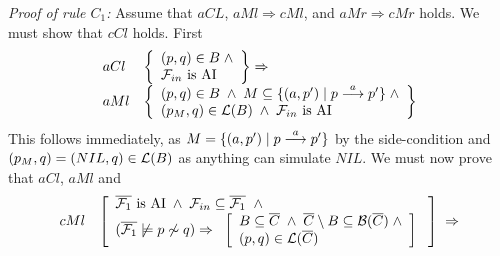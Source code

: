 \begin{theorem}[Soundness]
\begin{trivlist}
\item[\it Proof of rule\/ $C_1$:]
Assume that $aCL$, $aMl\Rightarrow cMl$, and $aMr\Rightarrow cMr$ holds. We must show that $cCl$ holds. First
\[
\begin{array}{ll}
aCl &
\left\{
\begin{array}{l}
(p,q)\in B \;\wedge\\
{\cal F}_{in} \mbox{ is AI}
\end{array}
\right\}\Rightarrow\\

aMl &
\left\{
\begin{array}{l}
(p,q)\in B\;\wedge\;M\subseteq\{(a,p')\mid p\stackrel{a}{\longrightarrow}p'\}\;\wedge\\
(p_M,q)\in{\cal L}(B)\;\wedge\;{\cal F}_{in} \mbox{ is AI}
\end{array}\right\}
\end{array}
\]
This follows immediately, as $M=\{(a,p')\mid p\stackrel{a}{\longrightarrow}p'\}$ by the side-condition and $(p_M,q) = (NIL,q)\in{\cal L}(B)$ as anything can simulate $NIL$. We must now prove that $aCl$, $aMl$ and
\[
\begin{array}{ll}
cMl &
\left[
\begin{array}{l}
\overline{{\cal F}_{1}}  \mbox{ is AI} \;\wedge\;{\cal F}_{in}\subseteq\overline{{\cal F}_{1}}\;\;\wedge\\
(\overline{{\cal F}_{1}}\not\models p\not\sim q)\Rightarrow\;\;
\left[
\begin{array}{l}
B\subseteq \overline{C}\; \wedge\; \overline{C}\setminus B\subseteq {\cal B}(\overline{C})\;\wedge\\
(p,q)\in{\cal L}(\overline{C})
\end{array}
\right]\
\end{array}
\right]\;\Rightarrow\\


\end{array}\]
\end{trivlist}
\end{theorem}
